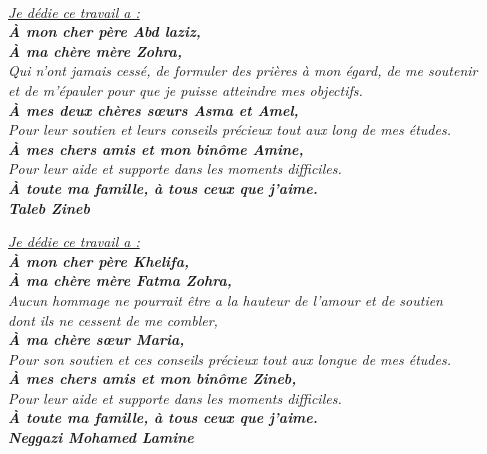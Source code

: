 \documentclass[12pt]{report}
\begin{document}
\newpage

\vspace*{0.1in}

\thispagestyle{empty}

\let\clearpage\relax

\begin{center}
    \textit{\fontsize{34}{46}{\bfseries{\color{Blue}{Dédicace}}}}
    \\
    \vspace{0.2in}
    \itshape
    \Large{\underline{Je dédie ce travail a :}}\\          \textbf{\large{À mon cher père Abd laziz,}}\\\vspace{-0.1in}
    \textbf{\large{À ma chère mère Zohra,}}\\
    \large{Qui n'ont jamais cessé, de formuler des prières à mon égard, de me soutenir\\\vspace{-0.1in}et de m'épauler pour que je puisse atteindre mes objectifs.}\\
    \textbf{\large{À mes deux chères sœurs Asma et Amel,}}\\
    \large{Pour leur soutien et leurs conseils précieux tout aux long de mes études.}\\
    \textbf{\large{À mes chers amis et mon binôme Amine,}}\\
    \large{Pour leur aide et supporte dans les moments difficiles.}\\
    \textbf{\large{À toute ma famille, à tous ceux que j’aime.}}\\\vspace{0.1in}
    \hfill\textbf{\Large{Taleb Zineb}}

    \vspace{0.2in}
    \itshape
    \Large{\underline{Je dédie ce travail a :}}\\          \textbf{\large{À mon cher père Khelifa,}}\\\vspace{-0.1in}
    \textbf{\large{À ma chère mère Fatma Zohra,}}\\
    \large{Aucun hommage ne pourrait être a la hauteur de l’amour et de soutien\\\vspace{-0.1in}dont ils ne cessent de me combler,}\\
    \textbf{\large{À ma chère sœur Maria,}}\\
    \large{Pour son soutien et ces conseils précieux tout aux longue de mes études.}\\
    \textbf{\large{À mes chers amis et mon binôme Zineb,}}\\
    \large{Pour leur aide et supporte dans les moments difficiles.}\\
    \textbf{\large{À toute ma famille, à tous ceux que j’aime.}}\\\vspace{0.1in}
    \hfill\textbf{\Large{Neggazi Mohamed Lamine}}


\end{center}
\end{document}
